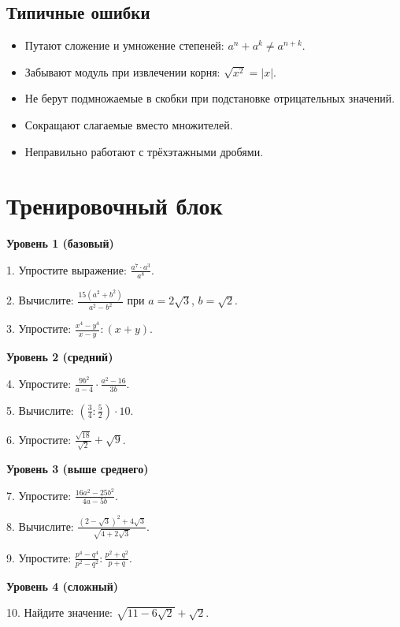 \documentclass[a4paper,12pt]{article}
\begin{document}
\subsection*{Типичные ошибки}
\begin{itemize}[leftmargin=*]
\item[$\times$] Путают сложение и умножение степеней: $a^n + a^k \neq a^{n+k}$.
\item[$\times$] Забывают модуль при извлечении корня: $\sqrt{x^2} = |x|$.
\item[$\times$] Не берут подмножаемые в скобки при подстановке отрицательных значений.
\item[$\times$] Сокращают слагаемые вместо множителей.
\item[$\times$] Неправильно работают с трёхэтажными дробями.
\end{itemize}

\newpage
\section*{Тренировочный блок}

\textbf{Уровень 1 (базовый)}

1. Упростите выражение: $\frac{a^7 \cdot a^3}{a^8}$.

2. Вычислите: $\frac{15(a^2+b^2)}{a^2-b^2}$ при $a=2\sqrt{3}$, $b=\sqrt{2}$.

3. Упростите: $\frac{x^4-y^4}{x-y} : (x+y)$.

\medskip
\textbf{Уровень 2 (средний)}

4. Упростите: $\frac{9b^2}{a-4} \cdot \frac{a^2-16}{3b}$.

5. Вычислите: $\left(\frac{3}{4} : \frac{5}{2}\right) \cdot 10$.

6. Упростите: $\frac{\sqrt{18}}{\sqrt{2}} + \sqrt{9}$.

\medskip
\textbf{Уровень 3 (выше среднего)}

7. Упростите: $\frac{16a^2-25b^2}{4a-5b}$.

8. Вычислите: $\frac{(2-\sqrt{3})^2 + 4\sqrt{3}}{\sqrt{4+2\sqrt{3}}}$.

9. Упростите: $\frac{p^4-q^4}{p^2-q^2} : \frac{p^2+q^2}{p+q}$.

\medskip
\textbf{Уровень 4 (сложный)}

10. Найдите значение: $\sqrt{11-6\sqrt{2}} + \sqrt{2}$.
\end{document}
